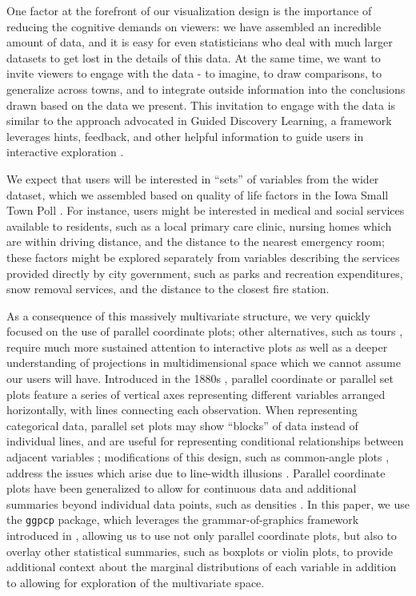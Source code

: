 \documentclass[letterpaper,inpress]{jdsart}
\begin{document}
One factor at the forefront of our visualization design is the importance of reducing the cognitive demands on viewers: we have assembled an incredible amount of data, and it is easy for even statisticians who deal with much larger datasets to get lost in the details of this data. At the same time, we want to invite viewers to engage with the data - to imagine, to draw comparisons, to generalize across towns, and to integrate outside information into the conclusions drawn based on the data we present.
This invitation to engage with the data is similar to the approach advocated in Guided Discovery Learning, a framework leverages hints, feedback, and other helpful information to guide users in interactive exploration \citep{dedonno}.

We expect that users will be interested in ``sets'' of variables from the wider dataset, which we assembled based on quality of life factors in the Iowa Small Town Poll \citep{petersCommunityResiliencyDeclining2019}. For instance, users might be interested in medical and social services available to residents, such as a local primary care clinic, nursing homes which are within driving distance, and the distance to the nearest emergency room; these factors might be explored separately from variables describing the services provided directly by city government, such as parks and recreation expenditures, snow removal services, and the distance to the closest fire station.

As a consequence of this massively multivariate structure, we very quickly focused on the use of parallel coordinate plots; other alternatives, such as tours \citep{tourr}, require much more sustained attention to interactive plots as well as a deeper understanding of projections in multidimensional space which we cannot assume our users will have. Introduced in the 1880s \citep{dOcagne:1885}, parallel coordinate or parallel set plots feature a series of vertical axes representing different variables arranged horizontally, with lines connecting each observation. When representing categorical data, parallel set plots may show ``blocks'' of data instead of individual lines, and are useful for representing conditional relationships between adjacent variables \citep{Bendix:2005}; modifications of this design, such as common-angle plots \citep{Hofmann:2013}, address the issues which arise due to line-width illusions \citep[\citet{sineillusion}]{sine}. Parallel coordinate plots have been generalized to allow for continuous data and additional summaries beyond individual data points, such as densities \citep{density-pcp}. In this paper, we use the \texttt{ggpcp} package, which leverages the grammar-of-graphics framework introduced in \citet{ggplot2}, allowing us to use not only parallel coordinate plots, but also to overlay other statistical summaries, such as boxplots or violin plots, to provide additional context about the marginal distributions of each variable in addition to allowing for exploration of the multivariate space.
\end{document}
